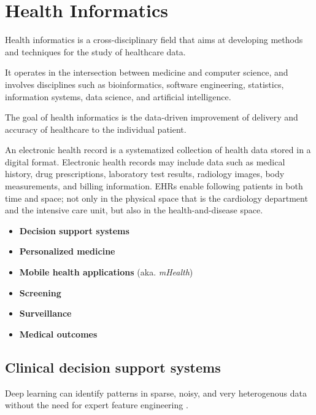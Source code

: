\chapter{Health Informatics}

Health informatics is a cross-disciplinary field
that aims at developing methods and techniques
for the study of healthcare data.

It operates in the intersection between medicine and computer science,
and involves disciplines such as
bioinformatics, software engineering, statistics, information systems,
data science, and artificial intelligence.

The goal of health informatics is the data-driven improvement
of delivery and accuracy of healthcare to the individual patient.
    
An electronic health record
is a systematized collection of health data 
stored in a digital format.
Electronic health records may include data such as
medical history, drug prescriptions, laboratory test results,
radiology images, body measurements, and billing information.
EHRs enable following patients in both time and space;
not only in the physical space that is the cardiology department
and the intensive care unit, but also in the health-and-disease space.

\begin{itemize}
    \item \textbf{Decision support systems}
    \item \textbf{Personalized medicine}
    \item \textbf{Mobile health applications} (aka. \textit{mHealth})
    \item \textbf{Screening}
    \item \textbf{Surveillance}
    \item \textbf{Medical outcomes}
\end{itemize}


\section{Clinical decision support systems}

Deep learning can identify patterns in sparse, noisy,
and very heterogenous data without the need for expert feature engineering
\cite{norgeotCall2019}.



